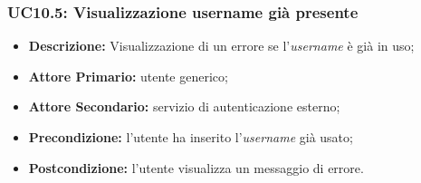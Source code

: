 \subsubsection{UC10.5: Visualizzazione username già presente}
\label{sec:UC10.5}
\begin{itemize}
    \item \textbf{Descrizione:} Visualizzazione di un errore se l'\textit{username} è già in uso;
    \item \textbf{Attore Primario:} utente generico;
    \item \textbf{Attore Secondario:} servizio di autenticazione esterno;
    \item \textbf{Precondizione:} l'utente ha inserito l'\textit{username} già usato;
    \item \textbf{Postcondizione:} l'utente visualizza un messaggio di errore. 
\end{itemize}